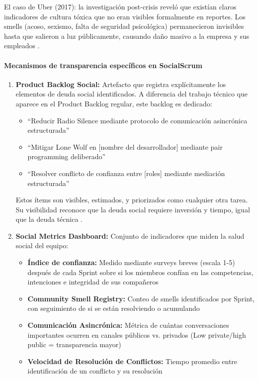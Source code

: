 El caso de Uber (2017): la investigación post-crisis reveló que existían claros indicadores de cultura tóxica que no eran visibles formalmente en reportes. Los smells (acoso, sexismo, falta de seguridad psicológica) permanecieron invisibles hasta que salieron a luz públicamente, causando daño masivo a la empresa y sus empleados \cite{saeeda2024nontechnicaldebt}.

\paragraph{Mecanismos de transparencia específicos en SocialScrum}

\begin{enumerate}

\item \textbf{Product Backlog Social:} Artefacto que registra explícitamente los elementos de deuda social identificados. A diferencia del trabajo técnico que aparece en el Product Backlog regular, este backlog es dedicado:
\begin{itemize}
\item ``Reducir Radio Silence mediante protocolo de comunicación asincrónica estructurada''
\item ``Mitigar Lone Wolf en [nombre del desarrollador] mediante pair programming deliberado''
\item ``Resolver conflicto de confianza entre [roles] mediante mediación estructurada''
\end{itemize}

Estos ítems son visibles, estimados, y priorizados como cualquier otra tarea. Su visibilidad reconoce que la deuda social requiere inversión y tiempo, igual que la deuda técnica \cite{saeeda2024nontechnicaldebt}.

\item \textbf{Social Metrics Dashboard:} Conjunto de indicadores que miden la salud social del equipo:
\begin{itemize}
\item \textbf{Índice de confianza:} Medido mediante surveys breves (escala 1-5) después de cada Sprint sobre si los miembros confían en las competencias, intenciones e integridad de sus compañeros
\item \textbf{Community Smell Registry:} Conteo de smells identificados por Sprint, con seguimiento de si se están resolviendo o acumulando
\item \textbf{Comunicación Asincrónica:} Métrica de cuántas conversaciones importantes ocurren en canales públicos vs. privados (Low private/high public = transparencia mayor)
\item \textbf{Velocidad de Resolución de Conflictos:} Tiempo promedio entre identificación de un conflicto y su resolución
\end{itemize}


\end{enumerate}
